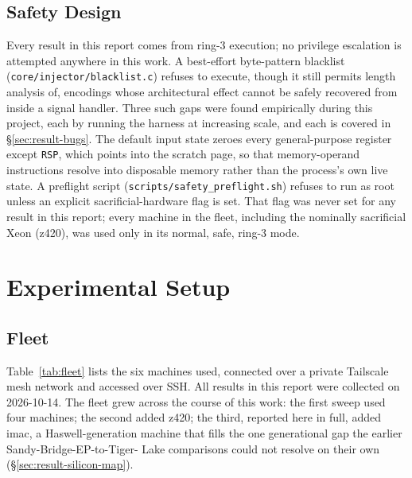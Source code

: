 \documentclass[11pt]{article}
\newcommand{\code}[1]{\texttt{#1}}
\begin{document}
\subsection{Safety Design}
\label{sec:safety}

Every result in this report comes from ring-3 execution; no privilege
escalation is attempted anywhere in this work. A best-effort byte-pattern
blacklist (\code{core/injector/blacklist.c}) refuses to execute, though
it still permits length analysis of, encodings whose architectural
effect cannot be safely recovered from inside a signal handler. Three
such gaps were found empirically during this project, each by running
the harness at increasing scale, and each is covered in
\S\ref{sec:result-bugs}. The default input state zeroes every
general-purpose register except \code{RSP}, which points into the
scratch page, so that memory-operand instructions resolve into
disposable memory rather than the process's own live state. A preflight
script (\code{scripts/safety\_preflight.sh}) refuses to run as root
unless an explicit sacrificial-hardware flag is set. That flag was never
set for any result in this report; every machine in the fleet, including
the nominally sacrificial Xeon (z420), was used only in its normal, safe,
ring-3 mode.

\section{Experimental Setup}

\subsection{Fleet}
\label{sec:fleet}

Table~\ref{tab:fleet} lists the six machines used, connected over a
private Tailscale mesh network and accessed over SSH. All results in this
report were collected on 2026-10-14. The fleet grew across the course of
this work: the first sweep used four machines; the second added z420; the
third, reported here in full, added imac, a Haswell-generation machine
that fills the one generational gap the earlier Sandy-Bridge-EP-to-Tiger-
Lake comparisons could not resolve on their own (\S\ref{sec:result-silicon-map}).
\end{document}
